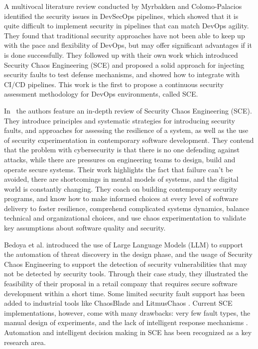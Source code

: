\documentclass[pdflatex,sn-mathphys-num]{sn-jnl}%
\theoremstyle{thmstyleone}%
\theoremstyle{thmstyletwo}%
\theoremstyle{thmstylethree}%
\begin{document}
	A multivocal literature review conducted by Myrbakken and Colomo-Palacios \cite{myrbakken2020security} identified the security issues in DevSecOps pipelines, which showed that it is quite difficult to implement security in pipelines that can match DevOps agility. They found that traditional security approaches have not been able to keep up with the pace and flexibility of DevOps, but may offer significant advantages if it is done successfully. They followed up with their own work \cite{myrbakken2021security} which introduced Security Chaos Engineering (SCE) and proposed a solid approach for injecting security faults to test defense mechanisms, and showed how to integrate with CI/CD pipelines. This work is the first to propose a continuous security assessment methodology for DevOps environments, called SCE.
	
In~\cite{shortridge2023security} the authors feature an in-depth review of Security Chaos Engineering (SCE). They introduce principles and systematic strategies for introducing security faults, and approaches for assessing the resilience of a system, as well as the use of security experimentation in contemporary software development. They contend that the problem with cybersecurity is that there is no one defending against attacks, while there are pressures on engineering teams to design, build and operate secure systems. Their work highlights the fact that failure can't be avoided, there are shortcomings in mental models of systems, and the digital world is constantly changing. They coach on building contemporary security programs, and know how to make informed choices at every level of software delivery to foster resilience, comprehend complicated systems dynamics, balance technical and organizational choices, and use chaos experimentation to validate key assumptions about software quality and security.
	
	Bedoya et al. \cite{bedoya2024enhancing} introduced the use of Large Language Models (LLM) to support the automation of threat discovery in the design phase, and the usage of Security Chaos Engineering to support the detection of security vulnerabilities that may not be detected by security tools. Through their case study, they illustrated the feasibility of their proposal in a retail company that requires secure software development within a short time. Some limited security fault support has been added to industrial tools like ChaosBlade \cite{chaosblade2021} and LitmusChaos \cite{litmus2022}. Current SCE implementations, however, come with many drawbacks: very few fault types, the manual design of experiments, and the lack of intelligent response mechanisms \cite{shortridge2023security}. Automation and intelligent decision making in SCE has been recognized as a key research area.
	
\end{document}
